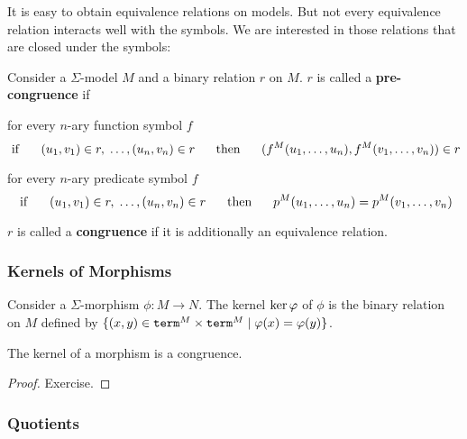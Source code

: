 It is easy to obtain equivalence relations on models.
But not every equivalence relation interacts well with the symbols.
We are interested in those relations that are closed under the symbols:

\begin{definition}
Consider a $\Sigma$-model $M$ and a binary relation $r$ on $M$.
$r$ is called a \textbf{pre-congruence} if
\begin{compactitem}
\item for every $n$-ary function symbol $f$
  \[\;\mathrm{if}\;\hspace*{.5cm} (u_1,v_1)\in r,\;\ldots,(u_n,v_n)\in r\hspace*{.5cm}\;\mathrm{then}\;\hspace*{.5cm} (f^M(u_1,\ldots,u_n),f^M(v_1,\ldots,v_n))\in r\]
\item for every $n$-ary predicate symbol $f$
  \[\;\mathrm{if}\;\hspace*{.5cm} (u_1,v_1)\in r,\;\ldots,(u_n,v_n)\in r\hspace*{.5cm}\;\mathrm{then}\;\hspace*{.5cm} p^M(u_1,\ldots,u_n)=p^M(v_1,\ldots,v_n)\]
\end{compactitem}
$r$ is called a \textbf{congruence} if it is additionally an equivalence relation.
\end{definition}

\subsubsection{Kernels of Morphisms}

\begin{definition}[Kernels]
Consider a $\Sigma$-morphism $\phi:M\to N$.
The kernel $\mathrm{ker}\, \varphi$ of $\phi$ is the binary relation on $M$ defined by $\{(x,y)\in \mathtt{term}^M\times \mathtt{term}^M\;|\;\varphi(x)=\varphi(y)\}$.
\end{definition}

\begin{theorem}
The kernel of a morphism is a congruence.
\end{theorem}
\begin{proof}
Exercise.
\end{proof}

\subsubsection{Quotients}

